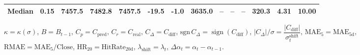 \begin{threeparttable}
{\begin{tabular}{lrrrrrrrrrrrrr}
 Median &     0.15 & 7457.5 & 7482.8 & 7457.5 &      -19.5 &                     -1.0 &              3635.0 &         -- &        -- &             -- &            320.3 &            4.31 &                  10.00 \\
\bottomrule
\end{tabular}
}%
\begin{tablenotes}\footnotesize
\item $\kappa=\kappa(\sigma)$, $B=B_{t-1}$, $C_p=C_{\text{pred}}$, $C_r=C_{\text{real}}$, $C_\Delta=C_{\text{diff}}$, $\mathrm{sgn}\,C_\Delta=\operatorname{sign}(C_{\text{diff}})$, $|C_\Delta|/\sigma=\dfrac{|C_{\text{diff}}|}{\sigma_t^{\text{shift}}}$, $\mathrm{MAE}_5=\mathrm{MAE}_{5\text{d}}$, $\mathrm{RMAE}= \mathrm{MAE}_5 / \text{Close}$, $\mathrm{HR}_{20}=\mathrm{HitRate}_{20\text{d}}$, 
$\lambda_{\text{shift}}=\lambda_t$, 
$\Delta\alpha_t=\alpha_t-\alpha_{t-1}$.
\end{tablenotes}
\end{threeparttable}
\endgroup